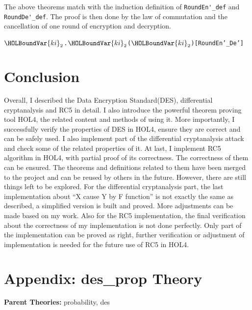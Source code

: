 \documentclass{article}
\begin{document}
The above theorems match with the induction definition of \verb|RoundEn'_def| and \verb|RoundDe'_def|. The proof is then done by
the law of commutation and the cancellation of one round of encryption and decryption.

\begin{alltt}
\HOLTokenTurnstile{} \HOLSymConst{\HOLTokenForall{}}   \ensuremath{\HOLBoundVar{ki}\sb{\mathrm{2}}}.    \ensuremath{\HOLBoundVar{ki}\sb{\mathrm{2}}} (   \ensuremath{\HOLBoundVar{ki}\sb{\mathrm{2}}} ) \HOLSymConst{=} \hfill{[RoundEn'_De']}
\end{alltt}

\section{Conclusion}
    Overall, I described the Data Encryption Standard(DES), differential cryptanalysis and RC5 in detail. I also introduce the powerful
    theorem proving tool HOL4, the related content and methods of using it. More importantly, I successfully verify the properties of DES
    in HOL4, ensure they are correct and can be safely used. I also implement part of the differential cryptanalysis attack and check
    some of the related properties of it. At last, I implement RC5 algorithm in HOL4, with partial proof of its correctness. The correctness
    of them can be ensured. The theorems and definitions related to them have been merged to the project and can be reused by others in the
    future. However, there are still things left to be explored. For the differential cryptanalysis part, the last implementation about
    ``X cause Y by F function'' is not exactly the same as described, a simplified version is built and proved. More adjustments can be
    made based on my work. Also for the RC5 implementation, the final verification about the correctness of my implementation is not done
    perfectly. Only part of the implementation can be proved as right, further verification or adjustment of implementation is needed for
    the future use of RC5 in HOL4.






\section*{Appendix: des\_prop Theory}
\begin{flushleft}
\textbf{Parent Theories:} probability, des
\end{flushleft}
\end{document}
